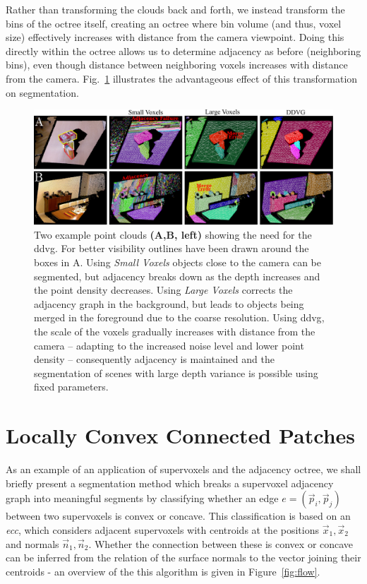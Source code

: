 Rather than transforming the clouds back and forth, we instead transform the bins of the octree itself, creating an octree where bin volume (and thus, voxel size) effectively increases with distance from the camera viewpoint. Doing this directly within the octree allows us to determine adjacency as before (neighboring bins), even though distance between neighboring voxels increases with distance from the camera. Fig.~\ref{fig:quantization_transform} illustrates the advantageous effect of this transformation on segmentation.

\begin{figure}
  \centering
  \includegraphics[width = \linewidth]{figures/CVPR2014/transform_results_v2}
\caption[Depth Adaptive Transform]{Two example point clouds \textbf{(A,B, left)} showing the need for the \gls{ddvg}. For better visibility outlines have been drawn around the boxes in A. Using \textit{Small Voxels} objects close to the camera can be segmented, but adjacency breaks down as the depth increases and the point density decreases. Using \textit{Large Voxels} corrects the adjacency graph in the background, but leads to objects being merged in the foreground due to the coarse resolution. Using \gls{ddvg}, the scale of the voxels gradually increases with distance from the camera -- adapting to the increased noise level and lower point density -- consequently adjacency is maintained and the segmentation of scenes with large depth variance is possible using fixed parameters. }
\label{fig:quantization_transform}
\end{figure}


\section{Locally Convex Connected Patches}
As an example of an application of supervoxels and the adjacency octree, we shall briefly present a segmentation method which breaks a supervoxel adjacency graph into meaningful segments by classifying whether an edge $e=(\vec p_i, \vec p_j)$ between two supervoxels is convex or concave. This classification is based on an \emph{\gls{ecc}}, which considers adjacent supervoxels with centroids at the positions $\vec x_1,\vec x_2$ and normals $\vec n_1, \vec n_2$. Whether the connection between these is convex or concave can be inferred from the relation of the surface normals to the vector joining their centroids - an overview of the this algorithm is given in Figure~\ref{fig:flow}.

